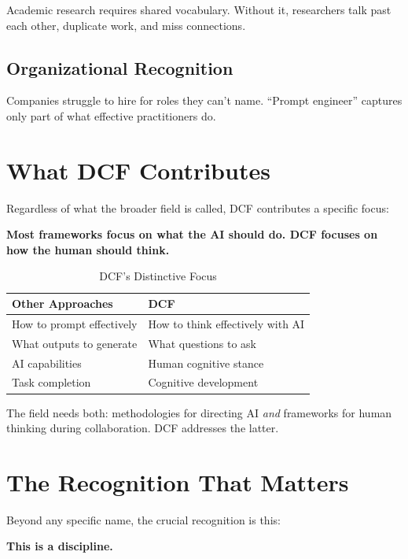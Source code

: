 Academic research requires shared vocabulary. Without it, researchers talk past each other, duplicate work, and miss connections.

\subsection{Organizational Recognition}

Companies struggle to hire for roles they can't name. ``Prompt engineer'' captures only part of what effective practitioners do.

\section{What DCF Contributes}

Regardless of what the broader field is called, DCF contributes a specific focus:

\begin{quotebox}
\textbf{Most frameworks focus on what the AI should do. DCF focuses on how the human should think.}
\end{quotebox}

\begin{table}[H]
\centering
\begin{tabular}{ll}
\toprule
\textbf{Other Approaches} & \textbf{DCF} \\
\midrule
How to prompt effectively & How to think effectively with AI \\
What outputs to generate & What questions to ask \\
AI capabilities & Human cognitive stance \\
Task completion & Cognitive development \\
\bottomrule
\end{tabular}
\caption{DCF's Distinctive Focus}
\end{table}

The field needs both: methodologies for directing AI \emph{and} frameworks for human thinking during collaboration. DCF addresses the latter.

\section{The Recognition That Matters}

Beyond any specific name, the crucial recognition is this:

\begin{quotebox}
\textbf{This is a discipline.}
\end{quotebox}

